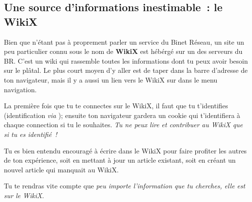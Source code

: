 
\subsection{Une source d'informations inestimable~: le WikiX}
\label{WikiX}

Bien que n'étant pas à proprement parler un service du Binet Réseau, un site un peu particulier connu sous le nom de \textbf{WikiX} est hébérgé sur un des serveurs du BR.
C'est un wiki qui rassemble toutes les informations dont tu peux avoir besoin sur le plâtal.
Le plus court moyen d'y aller est de taper  dans la barre d'adresse de ton navigateur, mais il y a aussi un lien vers le WikiX sur \fkz dans le menu navigation.

La première fois que tu te connectes sur le WikiX, il faut que tu t'identifies (identification \emph{via} );
ensuite ton navigateur gardera un cookie qui t'identifiera à chaque connection si tu le souhaites. \emph{Tu ne peux lire et contribuer au WikiX que si tu es identifié~!}

Tu es bien entendu encouragé à écrire dans le WikiX pour faire profiter les autres de ton expérience,
soit en mettant à jour un article existant, soit en créant un nouvel article qui manquait au WikiX.

Tu te rendras vite compte que \emph{peu importe l'information que tu cherches, elle est sur le WikiX.}
